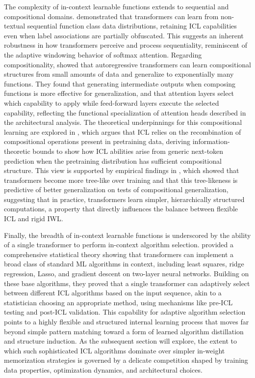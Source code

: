 \documentclass[11pt]{article}
\begin{document}
The complexity of in-context learnable functions extends to sequential and compositional domains. \cite{ref106} demonstrated that transformers can learn from non-textual sequential function class data distributions, retaining ICL capabilities even when label associations are partially obfuscated. This suggests an inherent robustness in how transformers perceive and process sequentiality, reminiscent of the adaptive windowing behavior of softmax attention. Regarding compositionality, \cite{ref107} showed that autoregressive transformers can learn compositional structures from small amounts of data and generalize to exponentially many functions. They found that generating intermediate outputs when composing functions is more effective for generalization, and that attention layers select which capability to apply while feed-forward layers execute the selected capability, reflecting the functional specialization of attention heads described in the architectural analysis. The theoretical underpinnings for this compositional learning are explored in \cite{ref108}, which argues that ICL relies on the recombination of compositional operations present in pretraining data, deriving information-theoretic bounds to show how ICL abilities arise from generic next-token prediction when the pretraining distribution has sufficient compositional structure. This view is supported by empirical findings in \cite{ref109}, which showed that transformers become more tree-like over training and that this tree-likeness is predictive of better generalization on tests of compositional generalization, suggesting that in practice, transformers learn simpler, hierarchically structured computations, a property that directly influences the balance between flexible ICL and rigid IWL.

Finally, the breadth of in-context learnable functions is underscored by the ability of a single transformer to perform in-context algorithm selection. \cite{ref110} provided a comprehensive statistical theory showing that transformers can implement a broad class of standard ML algorithms in context, including least squares, ridge regression, Lasso, and gradient descent on two-layer neural networks. Building on these base algorithms, they proved that a single transformer can adaptively select between different ICL algorithms based on the input sequence, akin to a statistician choosing an appropriate method, using mechanisms like pre-ICL testing and post-ICL validation. This capability for adaptive algorithm selection points to a highly flexible and structured internal learning process that moves far beyond simple pattern matching toward a form of learned algorithm distillation and structure induction. As the subsequent section will explore, the extent to which such sophisticated ICL algorithms dominate over simpler in-weight memorization strategies is governed by a delicate competition shaped by training data properties, optimization dynamics, and architectural choices.
\end{document}

